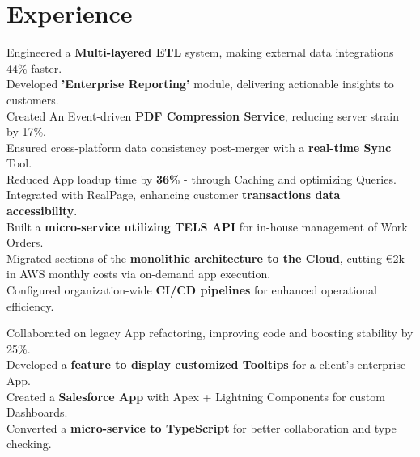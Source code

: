 \documentclass[]{deedy-resume-openfont}
\begin{document}
\begin{minipage}[t]{0.66\textwidth} 

\section{Experience}
\vspace{1pt}
\vspace{2pt}
\textbullet{} Engineered a \textbf{Multi-layered ETL} system, making external data integrations 44\% faster.\\
\textbullet{} Developed \textbf{'Enterprise Reporting'} module, delivering actionable insights to customers. \\
\textbullet{} Created An Event-driven \textbf{PDF Compression Service}, reducing server strain by 17\%. \\
\textbullet{} Ensured cross-platform data consistency post-merger with a \textbf{real-time Sync} Tool. \\
\textbullet{} Reduced App loadup time by \textbf{36\%} - through Caching and optimizing Queries. \\
\textbullet{} Integrated with RealPage, enhancing customer \textbf{transactions data accessibility}. \\
\textbullet{} Built a \textbf{micro-service utilizing TELS API} for in-house management of Work Orders. \\
\textbullet{} Migrated sections of the \textbf{monolithic architecture to the Cloud}, cutting €2k in AWS monthly costs via on-demand app execution. \\
\textbullet{} Configured organization-wide \textbf{CI/CD pipelines} for enhanced operational efficiency.
\sectionsep

\vspace{1pt}
\vspace{2pt}
\textbullet{} Collaborated on legacy App refactoring, improving code and boosting stability by 25\%. \\ 
\textbullet{} Developed a \textbf{feature to display customized Tooltips} for a client's enterprise App. \\
\textbullet{} Created a \textbf{Salesforce App} with Apex + Lightning Components for custom Dashboards. \\
\textbullet{} Converted a \textbf{micro-service to TypeScript} for better collaboration and type checking.
\sectionsep


\end{minipage}
\end{document}

